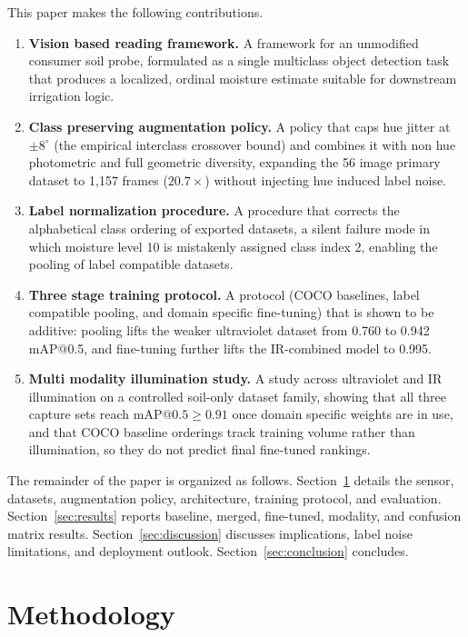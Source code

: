 ﻿\documentclass[journal]{IEEEtran}
\begin{document}
This paper makes the following contributions.
\begin{enumerate}
\item \textbf{Vision based reading framework.} A framework for an unmodified consumer soil probe, formulated as a single multiclass object detection task that produces a localized, ordinal moisture estimate suitable for downstream irrigation logic.
\item \textbf{Class preserving augmentation policy.} A policy that caps hue jitter at $\pm 8^{\circ}$ (the empirical interclass crossover bound) and combines it with non hue photometric and full geometric diversity, expanding the 56 image primary dataset to 1{,}157 frames ($20.7\times$) without injecting hue induced label noise.
\item \textbf{Label normalization procedure.} A procedure that corrects the alphabetical class ordering of exported datasets, a silent failure mode in which moisture level 10 is mistakenly assigned class index 2, enabling the pooling of label compatible datasets.
\item \textbf{Three stage training protocol.} A protocol (COCO baselines, label compatible pooling, and domain specific fine-tuning) that is shown to be additive: pooling lifts the weaker ultraviolet dataset from 0.760 to 0.942 mAP@0.5, and fine-tuning further lifts the IR-combined model to 0.995.
\item \textbf{Multi modality illumination study.} A study across ultraviolet and IR illumination on a controlled soil-only dataset family, showing that all three capture sets reach $\text{mAP@0.5} \geq 0.91$ once domain specific weights are in use, and that COCO baseline orderings track training volume rather than illumination, so they do not predict final fine-tuned rankings.
\end{enumerate}

The remainder of the paper is organized as follows. Section~\ref{sec:method} details the sensor, datasets, augmentation policy, architecture, training protocol, and evaluation. Section~\ref{sec:results} reports baseline, merged, fine-tuned, modality, and confusion matrix results. Section~\ref{sec:discussion} discusses implications, label noise limitations, and deployment outlook. Section~\ref{sec:conclusion} concludes.

\section{Methodology}
\label{sec:method}
\end{document}
